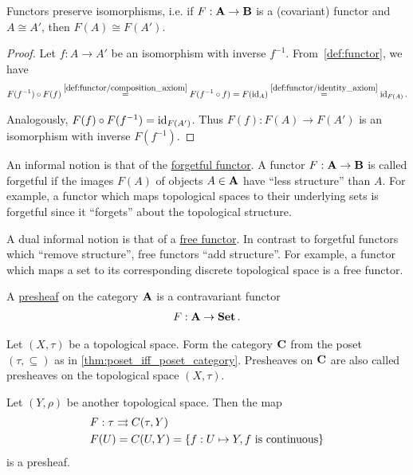 \begin{proposition}\label{thm:functors_preserve_isomorphisms}\cite[exercise 1.2.21]{Leinster2014}
  Functors preserve isomorphisms, i.e. if $F: \operatorname{\mathbf{A}} \to \operatorname{\mathbf{B}}$ is a (covariant) functor and $A \cong A'$, then $F(A) \cong F(A')$.
\end{proposition}
\begin{proof}
  Let $f: A \to A'$ be an isomorphism with inverse $f^{-1}$. From~\cref{def:functor}, we have
  \begin{align*}
    F(f^{-1}) \circ F(f)
    \overset{\ref{def:functor/composition_axiom}} =
    F(f^{-1} \circ f)
    =
    F(\operatorname{id}_A)
    \overset{\ref{def:functor/identity_axiom}} =
    \operatorname{id}_{F(A)}.
  \end{align*}

  Analogously, $F(f) \circ F(f^{-1}) = \operatorname{id}_{F(A')}$. Thus $F(f): F(A) \to F(A')$ is an isomorphism with inverse $F(f^{-1})$.
\end{proof}

\begin{note}\label{note:forgetful_free_functor}\cite[examples 1.2.3, 1.2.4]{Leinster2014}
  An informal notion is that of the \ul{forgetful functor}. A functor $F: \operatorname{\mathbf{A}} \to \operatorname{\mathbf{B}}$ is called forgetful if the images $F(A)$ of objects $A \in \operatorname{\mathbf{A}}$ have \enquote{less structure} than $A$. For example, a functor which maps topological spaces to their underlying sets is forgetful since it \enquote{forgets} about the topological structure.

  A dual informal notion is that of a \ul{free functor}. In contrast to forgetful functors which \enquote{remove structure}, free functors \enquote{add structure}. For example, a functor which maps a set to its corresponding discrete topological space is a free functor.
\end{note}

\begin{definition}\label{def:presheaf}\cite[definition 1.2.15]{Leinster2014}
  A \ul{presheaf} on the category $\operatorname{\mathbf{A}}$ is a contravariant functor
  \begin{align*}
    F: \operatorname{\mathbf{A}} \to \operatorname{\mathbf{Set}}.
  \end{align*}
\end{definition}

\begin{example}\label{ex:topological_space_presheaf}\cite[24]{Leinster2014}
  Let $(X, \tau)$ be a topological space. Form the category $\operatorname{\mathbf{C}}$ from the poset $(\tau, \subseteq)$ as in \cref{thm:poset_iff_poset_category}. Presheaves on $\operatorname{\mathbf{C}}$ are also called presheaves on the topological space $(X, \tau)$.

  Let $(Y, \rho)$ be another topological space. Then the map
  \begin{align*}
    &F: \tau \rightrightarrows C(\tau, Y) \\
    &F(U) = C(U, Y) = \{ f: U \mapsto Y, f \text{ is continuous} \}
  \end{align*}
  is a presheaf.
\end{example}

